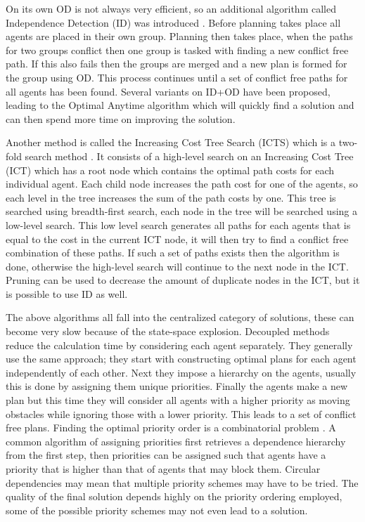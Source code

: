 \documentclass[a4paper]{article}
\begin{document}
On its own OD is not always very efficient, so an additional algorithm called
Independence Detection (ID) was introduced \cite{standley2010}. Before planning
takes place all agents are placed in their own group. Planning then takes
place, when the paths for two groups conflict then one group is tasked with
finding a new conflict free path. If this also fails then the groups are merged
and a new plan is formed for the group using OD. This process continues until a
set of conflict free paths for all agents has been found. Several variants on
ID+OD have been proposed, leading to the Optimal Anytime algorithm
\cite{standley2011} which will quickly find a solution and can then spend more
time on improving the solution.

Another method is called the Increasing Cost Tree Search (ICTS) which is a
two-fold search method \cite{sharon2013}. It consists of a high-level search on
an Increasing Cost Tree (ICT) which has a root node which contains the optimal
path costs for each individual agent. Each child node increases the path cost
for one of the agents, so each level in the tree increases the sum of the path
costs by one. This tree is searched using breadth-first search, each node in
the tree will be searched using a low-level search. This low level search
generates all paths for each agents that is equal to the cost in the current
ICT node, it will then try to find a conflict free combination of these paths.
If such a set of paths exists then the algorithm is done, otherwise the
high-level search will continue to the next node in the ICT. Pruning can be
used to decrease the amount of duplicate nodes in the ICT, but it is possible
to use ID as well.

The above algorithms all fall into the centralized category of solutions, these
can become very slow because of the state-space explosion. Decoupled methods
reduce the calculation time by considering each agent separately. They
generally use the same approach; they start with constructing optimal plans for
each agent independently of each other. Next they impose a hierarchy on the
agents, usually this is done by assigning them unique priorities. Finally the
agents make a new plan but this time they will consider all agents with a
higher priority as moving obstacles while ignoring those with a lower priority. 
This leads to a set of conflict free
plans. Finding the optimal priority order is a combinatorial problem
\cite{bennewitz2002}. A common algorithm of assigning priorities first
retrieves a dependence hierarchy from the first step, then priorities can be
assigned such that agents have a priority that is higher than that of agents
that may block them. Circular dependencies may mean that multiple priority
schemes may have to be tried. The quality of the final solution depends highly
on the priority ordering employed, some of the possible priority schemes may
not even lead to a solution.
\end{document}
